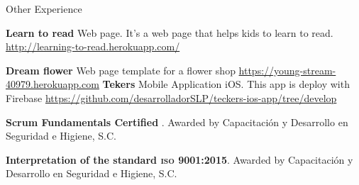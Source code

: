 \begin{rubric}{Other Experience}
\subrubric{}

\entry*[2020] \textbf{Learn to read} Web page. It's  a web page that helps kids to learn to read. \url{http://learning-to-read.herokuapp.com/}

\entry*[2019] \textbf{Dream flower} Web page template for a flower shop \url{https://young-stream-40979.herokuapp.com}
\entry*[2019] \textbf{Tekers} Mobile Application iOS. This app is deploy with Firebase \url{https://github.com/desarrolladorSLP/teckers-ios-app/tree/develop}
%

\entry*[Ene 2020] \textbf{ Scrum Fundamentals Certified }. Awarded by Capacitación y Desarrollo en Seguridad e Higiene, S.C.

\entry*[2016] \textbf{ Interpretation of the standard \textsc{iso 9001:2015}}. Awarded by Capacitación y Desarrollo en Seguridad e Higiene, S.C.


\end{rubric}